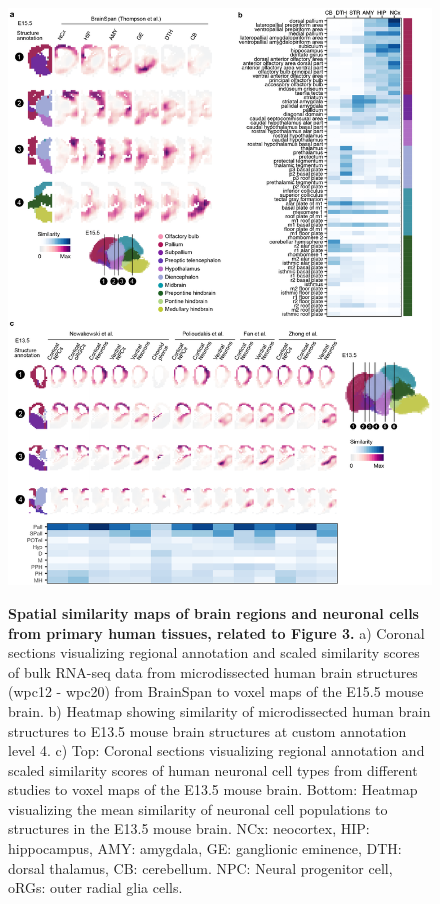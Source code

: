 \begin{figure}[h!]
    \centering
	\includegraphics[width=\textwidth]{figures/voxhunt/Supp_3}
    \label{fig:voxS3}
\end{figure}

\begin{figure}[t!]
    \centering
    \caption{\textbf{Spatial similarity maps of brain regions and neuronal cells from primary human tissues, related to Figure 3.} a) Coronal sections visualizing regional annotation and scaled similarity scores of bulk RNA-seq data from microdissected human brain structures (wpc12 - wpc20) from BrainSpan to voxel maps of the E15.5 mouse brain. b) Heatmap showing similarity of microdissected human brain structures to E13.5 mouse brain structures at custom annotation level 4. c) Top: Coronal sections visualizing regional annotation and scaled similarity scores of human neuronal cell types from different studies to voxel maps of the E13.5 mouse brain. Bottom: Heatmap visualizing the mean similarity of neuronal cell populations to structures in the E13.5 mouse brain. NCx: neocortex, HIP: hippocampus, AMY: amygdala, GE: ganglionic eminence, DTH: dorsal thalamus, CB: cerebellum. NPC: Neural progenitor cell, oRGs: outer radial glia cells.}
\end{figure}


